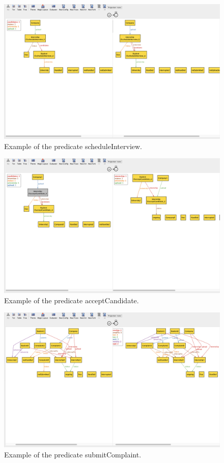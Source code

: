 \begin{figure}[H]
    \begin{center}
        \includegraphics[width=\linewidth]{Images/Alloy/scheduleInterview.png}
        \caption{Example of the predicate scheduleInterview.}
        \label{fig:schedule_intern_alloy}%
    \end{center}
\end{figure}

\begin{figure}[H]
    \begin{center}
        \includegraphics[width=\linewidth]{Images/Alloy/acceptCandidate.png}
        \caption{Example of the predicate acceptCandidate.}
        \label{fig:accept_candidate_alloy}%
    \end{center}
\end{figure}

\begin{figure}[H]
    \begin{center}
        \includegraphics[width=\linewidth]{Images/Alloy/submitComplaint.png}
        \caption{Example of the predicate submitComplaint.}
        \label{fig:submit_complaint_alloy}%
    \end{center}
\end{figure}